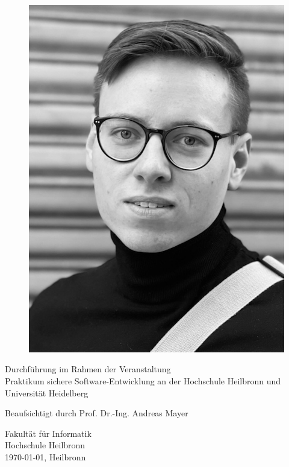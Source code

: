 \documentclass[10pt, a4paper,onecolumn ,titlepage]{article}
\begin{document}
\begin{titlepage}
\begin{center}
\begin{figure}[H]
\begin{minipage}[b]{.13\linewidth}
                    \includegraphics[width=\linewidth]{author_pictures/chris_2}
                \end{minipage}\label{fig:frederik}
            \end{figure}


            \vfill

            Durchführung im Rahmen der Veranstaltung \\ \glqq Praktikum sichere Software-Entwicklung\grqq{} an der Hochschule Heilbronn und Universität Heidelberg

            \vspace{0.2cm}

            Beaufsichtigt durch Prof. Dr.-Ing. Andreas Mayer

            \vspace{1.0cm}


            \vspace{0.8cm}

            Fakultät für Informatik\\
            Hochschule Heilbronn\\
            \today{}, Heilbronn

        \end{center}

    \end{titlepage}
\end{document}

